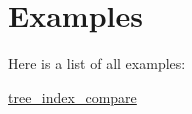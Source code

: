\section{Examples}
Here is a list of all examples\+:\begin{DoxyCompactItemize}
\item 
\hyperlink{tree_index_compare-example}{tree\+\_\+index\+\_\+compare}
\end{DoxyCompactItemize}
